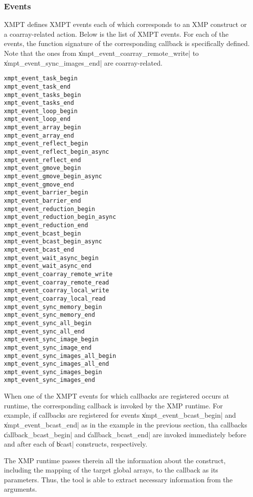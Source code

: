 \subsubsection{Events}

XMPT defines XMPT events each of which corresponds to an XMP
construct or a coarray-related action. Below is the list of XMPT
events. For each of the events, the function signature of the
corresponding callback is specifically defined. Note that the ones from
\|xmpt_event_coarray_remote_write| to\\ \|xmpt_event_sync_images_end|
are coarray-related.

\begin{verbatim}
xmpt_event_task_begin
xmpt_event_task_end
xmpt_event_tasks_begin
xmpt_event_tasks_end
xmpt_event_loop_begin
xmpt_event_loop_end
xmpt_event_array_begin
xmpt_event_array_end
xmpt_event_reflect_begin
xmpt_event_reflect_begin_async
xmpt_event_reflect_end
xmpt_event_gmove_begin
xmpt_event_gmove_begin_async
xmpt_event_gmove_end
xmpt_event_barrier_begin
xmpt_event_barrier_end
xmpt_event_reduction_begin
xmpt_event_reduction_begin_async
xmpt_event_reduction_end
xmpt_event_bcast_begin
xmpt_event_bcast_begin_async
xmpt_event_bcast_end
xmpt_event_wait_async_begin
xmpt_event_wait_async_end
xmpt_event_coarray_remote_write
xmpt_event_coarray_remote_read 
xmpt_event_coarray_local_write
xmpt_event_coarray_local_read
xmpt_event_sync_memory_begin
xmpt_event_sync_memory_end
xmpt_event_sync_all_begin
xmpt_event_sync_all_end
xmpt_event_sync_image_begin
xmpt_event_sync_image_end
xmpt_event_sync_images_all_begin
xmpt_event_sync_images_all_end
xmpt_event_sync_images_begin
xmpt_event_sync_images_end
\end{verbatim}

\sloppy
When one of the XMPT events for which callbacks are registered occurs at
runtime, the corresponding callback is invoked by the XMP runtime. For
example, if callbacks are registered for events
\|xmpt_event_bcast_begin| and\\ \|xmpt_event_bcast_end| as in the example
in the previous section, tha callbacks \|callback_bcast_begin| and
\|callback_bcast_end| are invoked immediately before and after each of
\|bcast| constructs, respectively.
\fussy

The XMP runtime passes therein all the information about the construct,
including the mapping of the target global arrays, to the
callback as its parameters. Thus, the tool is able to extract necessary
information from the arguments.

